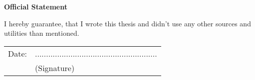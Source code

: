 \documentclass[12pt,a4paper,bibliography=totocnumbered,listof=totocnumbered]{scrartcl}
\begin{document}




\pagebreak


\pagebreak


\pagebreak


\pagebreak


\pagebreak


{}

\pagebreak




\newpage
\thispagestyle{empty}
\begin{center}
	\vspace*{5em}
	\huge\textbf{Official Statement}\\
\end{center}
\vspace{2em}

I hereby guarantee, that I wrote this thesis and didn't use any other sources and utilities than mentioned.

\vspace{4em}
\begin{minipage}{\linewidth}
	\begin{tabular}{p{15em}p{15em}}
		Date: &  .......................................................\\
		& \centering (Signature)\\
	\end{tabular}
\end{minipage}
\end{document}
